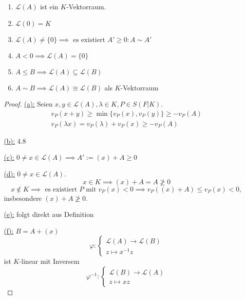 \begin{lemma}
    \begin{enumerate}[label=(\alph*)]
        \item $\mathcal{L}(A)$ ist ein $K$-Vektorraum.
        \item $\mathcal{L}(0) = K$
        \item $\mathcal{L}(A) \ne \{0\} \implies \text{ es existiert } A'\geq 0: A \sim A'$
        \item $ A < 0 \implies \mathcal{L}(A) = \{0\}$
        \item $A \leq B \implies \mathcal{L}(A) \subseteq \mathcal{L}(B)$
        \item $A \sim B \implies \mathcal{L}(A) \cong \mathcal{L}(B)$ als $K$-Vektorraum
    \end{enumerate}
\end{lemma}
\begin{proof}
    \underline{(a):} Seien $x,y \in \mathcal{L}(A), \lambda \in K, P \in S(F|K)$.
    \begin{align*}
        v_P(x + y) \geq \min\{v_P(x), v_P(y)\} \geq - v_P(A)\\
        v_P(\lambda x) = v_P(\lambda) + v_P(x) \geq - v_P(A)
    \end{align*}

    \underline{(b):} 4.8

    \underline{(c):} $0 \ne x \in \mathcal{L}(A) \implies A' := (x) + A \geq 0$

    \underline{(d):} $0 \ne x \in \mathcal{L}(A)$. 
    $$x \in K \implies (x) + A = A \not \geq 0$$
    $$ x \notin K \implies \text{ es existiert } P \text{ mit } v_P(x) < 0 \implies v_P((x) + A) \leq v_P(x) < 0,$$
    insbesondere $(x) + A \not \geq 0$.

    \underline{(e):} folgt direkt aus Definition

    \underline{(f):} $B=A+(x)$ $$ \varphi: \begin{cases}
        \mathcal{L}(A) \to \mathcal{L}(B)\\
        z \mapsto x^{-1}z
    \end{cases}$$
    ist $K$-linear mit Inversem
    $$ \varphi^{-1}: \begin{cases}
        \mathcal{L}(B) \to \mathcal{L}(A)\\
        z \mapsto xz
    \end{cases}$$
\end{proof}


